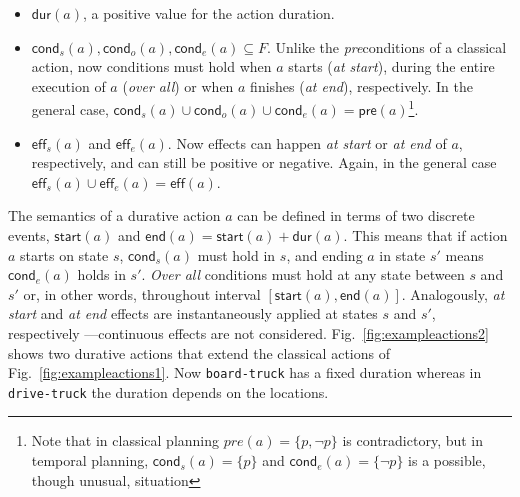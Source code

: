 \documentclass[runningheads]{llncs}
\newcommand{\pre}{\mathsf{pre}}    %
\newcommand{\eff}{\mathsf{eff}}    %
\newcommand{\cond}{\mathsf{cond}}  %
\newcommand{\dur}{\mathsf{dur}}    %
\newcommand{\start}{\mathsf{start}}%
\newcommand{\en}{\mathsf{end}}     %
\begin{document}
\begin{itemize}

\item $\dur(a)$, a positive value for the action duration.

\item $\cond_s(a), \cond_o(a), \cond_e(a) \subseteq F$. Unlike the \emph{pre}conditions of a classical action, now conditions must hold when $a$ starts ({\em at start}), during the entire execution of $a$ ({\em over all}) or when $a$ finishes ({\em at end}), respectively. In the general case, $\cond_s(a) \cup \cond_o(a) \cup \cond_e(a) = \pre(a)$\footnote{Note that in classical planning $pre(a)=\{p,\neg p\}$ is contradictory, but in temporal planning, $\cond_s(a)=\{p\}$ and $\cond_e(a)=\{\neg p\}$ is a possible, though unusual, situation}.


\item $\eff_s(a)$ and $\eff_e(a)$. Now effects can happen {\em at start} or {\em at end} of $a$, respectively, and can still be positive or negative. Again, in the general case $\eff_s(a) \cup \eff_e(a) = \eff(a)$.

\end{itemize}



The semantics of a durative action $a$ can be defined in terms of two discrete events, $\start(a)$ and $\en(a)=\start(a)+\dur(a)$. This means that if action $a$ starts on state $s$, $\cond_s(a)$ must hold in $s$, and ending $a$ in state $s'$ means $\cond_e(a)$ holds in $s'$. {\em Over all} conditions must hold at any state between $s$ and $s'$ or, in other words, throughout interval $[\start(a),\en(a)]$.
Analogously, {\em at start} and {\em at end} effects are instantaneously applied at states $s$ and $s'$, respectively ---continuous effects are not considered.
Fig.~\ref{fig:exampleactions2} shows two durative actions that extend the classical actions of Fig.~\ref{fig:exampleactions1}. Now \texttt{board-truck} has a fixed duration whereas in \texttt{drive-truck} the duration depends on the locations.
\end{document}
